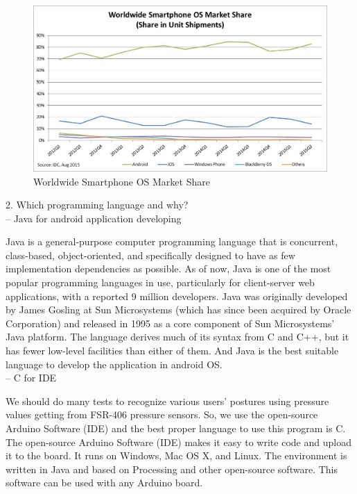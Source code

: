 \documentclass[conference]{IEEEtran}
\begin{document}
\begin{figure}[htbp]
\begin{center}
    \includegraphics[scale=0.4]{img_03.png}
    \caption{Worldwide Smartphone OS Market Share} 
\end{center}
\end{figure}

2.	Which programming language and why?\\

-- Java for android application developing

Java is a general-purpose computer programming language that is concurrent, class-based, object-oriented, and specifically designed to have as few implementation dependencies as possible. As of now, Java is one of the most popular programming languages in use, particularly for client-server web applications, with a reported 9 million developers. Java was originally developed by James Gosling at Sun Microsystems (which has since been acquired by Oracle Corporation) and released in 1995 as a core component of Sun Microsystems' Java platform. The language derives much of its syntax from C and C++, but it has fewer low-level facilities than either of them. And Java is the best suitable language to develop the application in android OS.\\

-- C for IDE

We should do many tests to recognize various users' postures using pressure values getting from FSR-406 pressure sensors. So, we use the open-source Arduino Software (IDE) and the best proper language to use this program is C. The open-source Arduino Software (IDE) makes it easy to write code and upload it to the board. It runs on Windows, Mac OS X, and Linux. The environment is written in Java and based on Processing and other open-source software. This software can be used with any Arduino board.\\
\end{document}
